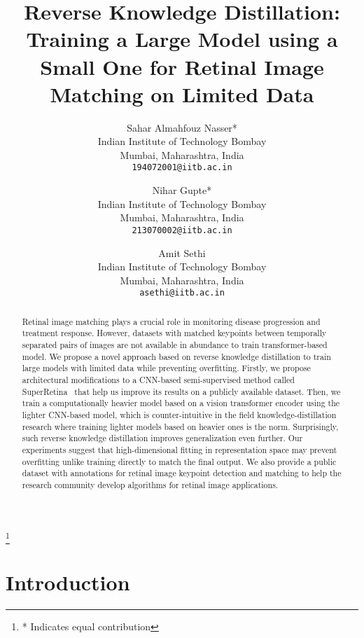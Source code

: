\documentclass[10pt,twocolumn,letterpaper]{article}
\begin{document}
\title{Reverse Knowledge Distillation: Training a Large Model using a Small One for Retinal Image Matching on Limited Data}\author{Sahar Almahfouz Nasser*\\
Indian Institute of Technology Bombay\\
Mumbai, Maharashtra, India\\
{\tt\small 194072001@iitb.ac.in}
\and
Nihar Gupte*\\
Indian Institute of Technology Bombay\\
Mumbai, Maharashtra, India\\
{\tt\small 213070002@iitb.ac.in}
\and
Amit Sethi\\
Indian Institute of Technology Bombay\\
Mumbai, Maharashtra, India\\
{\tt\small asethi@iitb.ac.in}
}

\maketitle
\footnote{* Indicates equal contribution}
\begin{abstract}
Retinal image matching plays a crucial role in monitoring disease progression and treatment response. However, datasets with matched keypoints between temporally separated pairs of images are not available in abundance to train transformer-based model. We propose a novel approach based on reverse knowledge distillation to train large models with limited data while preventing overfitting. Firstly, we propose architectural modifications to a CNN-based semi-supervised method called SuperRetina~\cite{liu2022semi} that help us improve its results on a publicly available dataset. Then, we train a computationally heavier model based on a vision transformer encoder using the lighter CNN-based model, which is counter-intuitive in the field knowledge-distillation research where training lighter models based on heavier ones is the norm. Surprisingly, such reverse knowledge distillation improves generalization even further. Our experiments suggest that high-dimensional fitting in representation space may prevent overfitting unlike training directly to match the final output. We also provide a public dataset with annotations for retinal image keypoint detection and matching to help the research community develop algorithms for retinal image applications. 

\end{abstract}

\section{Introduction}
\label{sec:intro}
\end{document}
